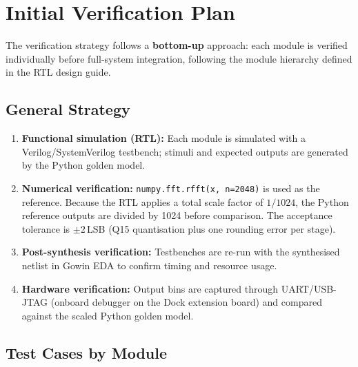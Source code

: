 \documentclass[12pt, a4paper]{article}
\begin{document}
\section{Initial Verification Plan}

The verification strategy follows a \textbf{bottom-up} approach: each module
is verified individually before full-system integration, following the
module hierarchy defined in the RTL design guide.

\subsection{General Strategy}

\begin{enumerate}
    \item \textbf{Functional simulation (RTL):} Each module is simulated with a
          Verilog/SystemVerilog testbench; stimuli and expected outputs are
          generated by the Python golden model.

    \item \textbf{Numerical verification:} \texttt{numpy.fft.rfft(x, n=2048)}
          is used as the reference.
          Because the RTL applies a total scale factor of $1/1024$, the
          Python reference outputs are divided by 1024 before comparison.
          The acceptance tolerance is $\pm 2$\,LSB (Q15 quantisation plus
          one rounding error per stage).

    \item \textbf{Post-synthesis verification:} Testbenches are re-run with
          the synthesised netlist in Gowin EDA to confirm timing and resource
          usage.

    \item \textbf{Hardware verification:} Output bins are captured through
          UART/USB-JTAG (onboard debugger on the Dock extension board) and
          compared against the scaled Python golden model.
\end{enumerate}

\subsection{Test Cases by Module}
\end{document}
